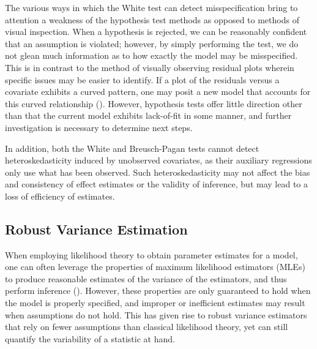 \documentclass[12pt]{article} %
\theoremstyle{definition}
\begin{document}
		The various ways in which the White test can detect misspecification bring to attention a weakness of the hypothesis test methods as opposed to methods of visual inspection.
		When a hypothesis is rejected, we can be reasonably confident that an assumption is violated; however, by simply performing the test, we do not glean much information as to how exactly the
		model may be misspecified. This is in contrast to the method of visually observing residual plots wherein specific issues may be easier to identify.
		If a plot of the residuals versus a covariate exhibits a curved pattern, one may posit a new model that accounts for this curved relationship (\cite{Miles}).
		However, hypothesis tests offer little direction other than that the current model exhibits lack-of-fit in some manner, and further investigation is necessary to determine next steps.

		In addition, both the White and Breusch-Pagan tests cannot detect heteroskedasticity induced by unobserved covariates, as their auxiliary regressions only use what has been observed. Such heteroskedasticity
		may not affect the bias and consistency of effect estimates or the validity of inference, but may lead to a loss of efficiency of estimates. 

		\subsection*{Robust Variance Estimation}
	
		When employing likelihood theory to obtain parameter estimates for a model, one can often leverage the properties of maximum likelihood estimators (MLEs) to produce reasonable estimates of the variance of the
		estimators, and thus perform inference (\cite{Millar}). However, these properties are only guaranteed to hold when the model is properly specified, and improper or inefficient estimates may result when assumptions
		do not hold. This has given rise to robust variance estimators that rely on fewer assumptions than classical likelihood theory, yet can still quantify the variability of a statistic
		at hand.
\end{document}

